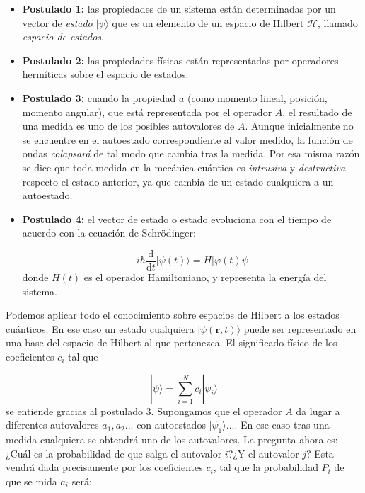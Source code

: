 \documentclass[12pt,a4paper]{book}
\numberwithin{equation}{chapter}
\numberwithin{figure}{chapter}
\newcommand{\D}{\mathrm{d}}
\newcommand{\derivadas}[2]{\frac{\D #1}{\D #2}}
\newcommand{\rn}{\mathbf{r}}
\begin{document}
\begin{itemize}
\item \textbf{Postulado 1:} las propiedades de un sistema están determinadas por un vector de \textit{estado} $|\psi \rangle$ que es un elemento de un espacio de Hilbert $\mathcal{H}$, llamado \textit{espacio de estados}. \\
\item \textbf{Postulado 2:} las propiedades físicas están representadas por operadores hermíticas sobre el espacio de estados.  \\
\item \textbf{Postulado 3:} cuando la propiedad $a$ (como momento lineal, posición, momento angular), que está representada por el operador $A$, el resultado de una medida es uno de los posibles autovalores de $A$. Aunque inicialmente no se encuentre en el autoestado correspondiente al valor medido, la función de ondas \textit{colapsará} de tal modo que cambia tras la medida. Por esa misma razón se dice que toda medida en la mecánica cuántica es \textit{intrusiva} y \textit{destructiva} respecto el estado anterior, ya que cambia de un estado cualquiera a un autoestado. 
\item \textbf{Postulado 4:} el vector de estado o estado evoluciona con el tiempo de acuerdo con la ecuación de Schrödinger:

\begin{equation}
i \hbar \derivadas{}{t}  | \psi (t) \rangle  = H | \varphi (t) \psi \label{Ec:02.01-Schrodinger}
\end{equation}
donde $H(t)$ es el operador Hamiltoniano, y representa la energía del sistema. 
\end{itemize}

Podemos aplicar todo el conocimiento sobre espacios de Hilbert a los estados cuánticos. En ese caso un estado cualquiera $| \psi (\rn,t) \rangle$ puede ser representado en una base del espacio de Hilbert al que pertenezca. El significado físico de los coeficientes $c_i$ tal que

\begin{equation}
|\psi \rangle =  \sum_{i=1}^N c_i |\psi_i \rangle
\end{equation}
se entiende gracias al postulado 3. Supongamos que el operador $A$ da lugar a diferentes autovalores $a_1,a_2...$ con autoestados $|\psi_1 \rangle...$. En ese caso tras una medida cualquiera se obtendrá uno de los autovalores. La pregunta ahora es: ¿Cuál es la probabilidad de que salga el autovalor $i$?¿Y el autovalor $j$? Esta vendrá dada precisamente por los coeficientes $c_i$, tal que la probabilidad $P_i$ de que se mida $a_i$ será:
\end{document}
